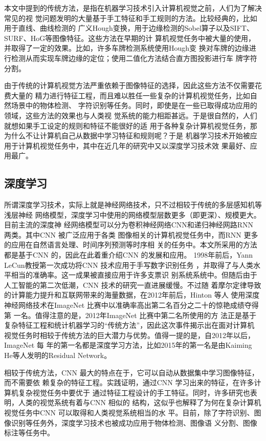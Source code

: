 本文中提到的传统方法，是指在机器学习技术引入计算机视觉之前，人们为了解决常见的视
觉问题发明的大量基于手工特征和手工规则的方法。比较经典的，比如用于直线、曲线检测的
广义Hough变换，用于边缘检测的Sobel算子以及SIFT、SURF、HoG等图像特征。这些方法在早期的计
算机视觉任务中被大量的使用，并取得了一定的效果。比如，许多车牌检测系统使用Hough变
换对车牌的边缘进行检测从而实现车牌边缘的定位；使用二值化方法结合直方图投影进行车
牌字符分割。

由于传统的计算机视觉方法严重依赖于图像特征的选择，因此这些方法不仅需要花费大量的
精力进行特征工程，而且难以胜任一些复杂的计算机视觉任务，比如自然场景中的物体检测、
字符识别等任务。同时，即使是在一些已取得成功应用的领域，这些方法的效果也与人类视
觉系统的能力相距甚远。于是很自然的，人们就想如果手工设定的规则和特征不能很好的适
用于各种复杂计算机视觉任务，那为什么不让计算机自己从数据中学习特征和规则呢？于是
机器学习技术开始被应用于计算机视觉任务中，其中在近几年的研究中又以深度学习技术效
果最好、应用最广。

\subsection{深度学习}

所谓深度学习技术，实际上就是神经网络技术，只不过相较于传统的多层感知机等浅层神经
网络模型，深度学习中使用的网络模型层数更多（即更深）、规模更大。目前主流的深度神
经网络模型可以分为卷积神经网络CNN和递归神经网路RNN 两类。其中CNN 被广泛应用于各类
图像相关的计算机视觉任务中，而RNN 更多的应用在自然语言处理、时间序列预测等时序相
关的任务中。本文所采用的方法都是基于CNN 的，因此在此着重介绍CNN 的发展和应用。
1998年前后，Yann LeCun教授第一次成功将CNN 技术应用于手写数字识别任务
\cite{LeCun:1990vp}，并取得了与人类水平相当的准确率。这一成果被直接应用于许多支票识
别系统系统中。但随后由于人工智能的第二次低潮，CNN 技术的研究一直进展缓慢。不过随
着摩尔定律导致的计算能力提升和互联网带来的海量数据，在2012年前后，Hinton 等人
使用深度神经网络技术在ImageNet 比赛中以准确率高出第二名百分之二十的惊艳成绩夺得第
一名\cite{Krizhevsky:2012wl}。值得注意的是，2012年ImageNet 比赛中第二名所使用的方
法正是基于复杂特征工程和统计机器学习的“传统方法”，因此这次事件揭示出在面对计算机
视觉任务时相较于传统方法的巨大潜力与优势。值得一提的是，自2012年以后，ImageNet 每
年的第一名都是深度学习方法，比如2015年的第一名是由Kaiming He等人发明的Residual
Network\cite{He:2015tt}。

相较于传统方法，CNN 最大的特点在于，它可以自动从数据集中学习图像特征，而不需要依
赖复杂的特征工程。实践证明，通过CNN 学习出来的特征，在许多计算机复杂视觉任务中要优于
通过特征工程设计的手工特征。同时，许多研究也表明，人类的视觉系统有着与CNN 相似的
结构，这似乎也解释了为何在复杂计算机视觉任务中CNN 可以取得和人类视觉系统相当的水
平。目前，除了字符识别、图像识别等任务外，深度学习技术也被成功应用于物体检测、图像语
义分割、图像标注等任务中。


